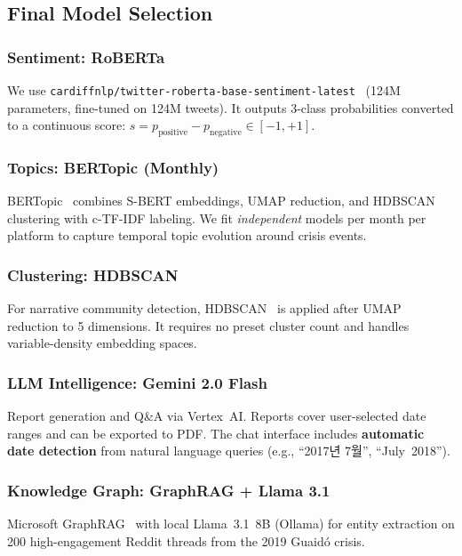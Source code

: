 \documentclass[12pt, a4paper]{article}
\begin{document}
\subsection{Final Model Selection}

\subsubsection{Sentiment: RoBERTa}
We use \texttt{cardiffnlp/twitter-roberta-base-sentiment-latest}~\cite{loureiro2022timelms} (124M parameters, fine-tuned on 124M tweets). It outputs 3-class probabilities converted to a continuous score:
$s = p_{\text{positive}} - p_{\text{negative}} \in [-1, +1]$.

\subsubsection{Topics: BERTopic (Monthly)}
BERTopic~\cite{grootendorst2022bertopic} combines S-BERT embeddings, UMAP reduction, and HDBSCAN clustering with c-TF-IDF labeling. We fit \emph{independent} models per month per platform to capture temporal topic evolution around crisis events.

\subsubsection{Clustering: HDBSCAN}
For narrative community detection, HDBSCAN~\cite{campello2013density} is applied after UMAP reduction to 5 dimensions. It requires no preset cluster count and handles variable-density embedding spaces.

\subsubsection{LLM Intelligence: Gemini 2.0 Flash}
Report generation and Q\&A via Vertex~AI. Reports cover user-selected date ranges and can be exported to PDF. The chat interface includes \textbf{automatic date detection} from natural language queries (e.g., ``2017년 7월'', ``July~2018'').

\subsubsection{Knowledge Graph: GraphRAG + Llama 3.1}
Microsoft GraphRAG~\cite{edge2024local} with local Llama~3.1~8B (Ollama) for entity extraction on 200 high-engagement Reddit threads from the 2019 Guaid\'{o} crisis.


\end{document}
